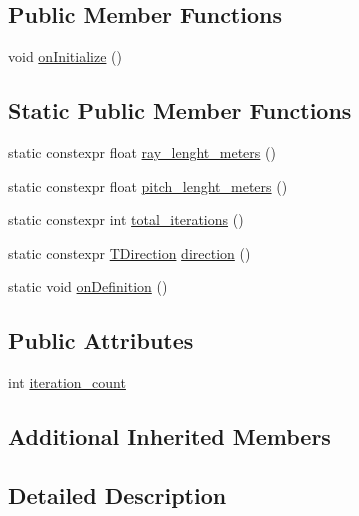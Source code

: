 \subsection*{Public Member Functions}
\begin{DoxyCompactItemize}
\item 
void \hyperlink{structsm__dance__bot_1_1SS4_1_1SsFPattern1_af69988c9481251c8e830779732db18cb}{on\+Initialize} ()
\end{DoxyCompactItemize}
\subsection*{Static Public Member Functions}
\begin{DoxyCompactItemize}
\item 
static constexpr float \hyperlink{structsm__dance__bot_1_1SS4_1_1SsFPattern1_ab6c84af47649dfe8cc5f2097ab01968b}{ray\+\_\+lenght\+\_\+meters} ()
\item 
static constexpr float \hyperlink{structsm__dance__bot_1_1SS4_1_1SsFPattern1_a603b30123514bdab9efbfc8c2069587c}{pitch\+\_\+lenght\+\_\+meters} ()
\item 
static constexpr int \hyperlink{structsm__dance__bot_1_1SS4_1_1SsFPattern1_a5c074a09438a374f3c8b268360936025}{total\+\_\+iterations} ()
\item 
static constexpr \hyperlink{namespacesm__dance__bot_1_1f__pattern__states_acc99b72745466e5dcee9272425a34e58}{T\+Direction} \hyperlink{structsm__dance__bot_1_1SS4_1_1SsFPattern1_a4d286cea10dd7a14743a89f5a2131dc5}{direction} ()
\item 
static void \hyperlink{structsm__dance__bot_1_1SS4_1_1SsFPattern1_a29e23974126c002b96ecd1d3df40632c}{on\+Definition} ()
\end{DoxyCompactItemize}
\subsection*{Public Attributes}
\begin{DoxyCompactItemize}
\item 
int \hyperlink{structsm__dance__bot_1_1SS4_1_1SsFPattern1_abd668281596d2fc992d26eec97e69cb6}{iteration\+\_\+count}
\end{DoxyCompactItemize}
\subsection*{Additional Inherited Members}


\subsection{Detailed Description}


